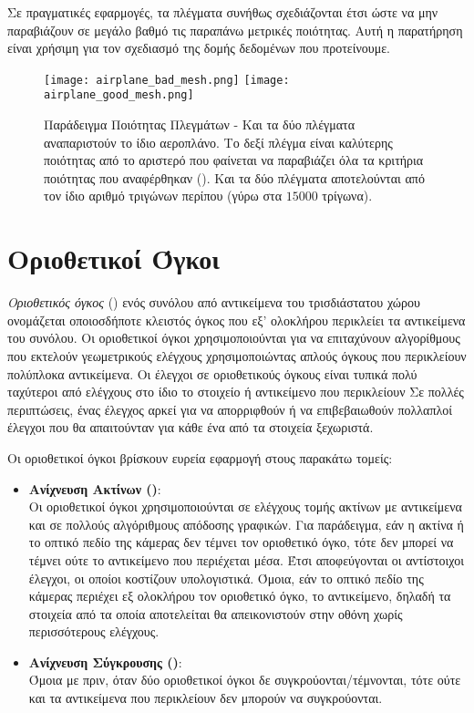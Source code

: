 Σε πραγματικές εφαρμογές, τα πλέγματα συνήθως σχεδιάζονται έτσι ώστε 
να μην παραβιάζουν σε μεγάλο βαθμό τις παραπάνω μετρικές ποιότητας.
Αυτή η παρατήρηση είναι χρήσιμη για τον σχεδιασμό της δομής δεδομένων 
που προτείνουμε.

\begin{figure}[h]
    \centering
    \texttt{[image: airplane\_bad\_mesh.png]}
    \texttt{[image: airplane\_good\_mesh.png]}
    \caption[Παράδειγμα Ποιότητας Πλεγμάτων]{
        Παράδειγμα Ποιότητας Πλεγμάτων - Και τα δύο πλέγματα 
        αναπαριστούν το ίδιο αεροπλάνο. Το δεξί πλέγμα είναι 
        καλύτερης ποιότητας από το αριστερό που φαίνεται να 
        παραβιάζει όλα τα κριτήρια ποιότητας που αναφέρθηκαν
        (). Και τα 
        δύο πλέγματα αποτελούνται από τον ίδιο αριθμό τριγώνων
        περίπου (γύρω στα $15000$ τρίγωνα).
    }
\end{figure}

\section{Οριοθετικοί Όγκοι}
\label{sec:bounding_volumes}
\textit{Οριοθετικός όγκος} (\textbf{}) ενός συνόλου 
από αντικείμενα του τρισδιάστατου χώρου ονομάζεται οποιοσδήποτε 
κλειστός όγκος που εξ' ολοκλήρου περικλείει τα αντικείμενα του συνόλου. 
Οι οριοθετικοί όγκοι χρησιμοποιούνται για να επιταχύνουν αλγορίθμους   
που εκτελούν γεωμετρικούς ελέγχους χρησιμοποιώντας απλούς όγκους 
που περικλείουν πολύπλοκα αντικείμενα.
Οι έλεγχοι σε οριοθετικούς όγκους είναι τυπικά πολύ ταχύτεροι από 
ελέγχους στο ίδιο το στοιχείο ή αντικείμενο που περικλείουν 
Σε πολλές περιπτώσεις, ένας έλεγχος αρκεί για να απορριφθούν ή 
να επιβεβαιωθούν πολλαπλοί έλεγχοι που θα απαιτούνταν για κάθε ένα 
από τα στοιχεία ξεχωριστά.

Οι οριοθετικοί όγκοι βρίσκουν ευρεία εφαρμογή στους παρακάτω τομείς:
\begin{itemize}
    \item \textbf{Ανίχνευση Ακτίνων ()}:\\
    Oι οριοθετικοί όγκοι χρησιμοποιούνται σε ελέγχους τομής ακτίνων 
    με αντικείμενα και σε πολλούς αλγόριθμους απόδοσης γραφικών.
    Για παράδειγμα, εάν η ακτίνα ή το οπτικό πεδίο της κάμερας
    δεν τέμνει τον οριοθετικό όγκο, τότε δεν μπορεί να τέμνει ούτε 
    το αντικείμενο που περιέχεται μέσα. Έτσι αποφεύγονται οι 
    αντίστοιχοι έλεγχοι, οι οποίοι κοστίζουν υπολογιστικά.
    Όμοια, εάν το οπτικό πεδίο της κάμερας περιέχει εξ ολοκλήρου 
    τον οριοθετικό όγκο, το αντικείμενο, δηλαδή τα στοιχεία από τα
    οποία αποτελείται θα απεικονιστούν στην 
    οθόνη χωρίς περισσότερους ελέγχους. 
    
    \item \textbf{Ανίχνευση Σύγκρουσης ()}:\\
    Όμοια με πριν, όταν δύο οριοθετικοί όγκοι δε συγκρούονται/τέμνονται, 
    τότε ούτε και τα αντικείμενα που περικλείουν δεν μπορούν να συγκρούονται.
\end{itemize}

